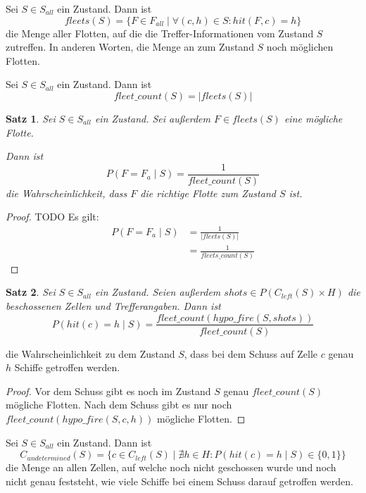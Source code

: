 \documentclass[a4paper,12pt]{llncs}
\numberwithin{equation}{section}
\newtheorem{satz}{Satz}
\begin{document}
\begin{definition}
Sei $S\in S_{all}$ ein Zustand.
Dann ist
\[
fleets(S)=\{F\in F_{all} \mid \forall (c,h) \in S \colon hit(F, c)=h\}
\]
die Menge aller Flotten, auf die die Treffer-Informationen vom Zustand $S$ zutreffen.
In anderen Worten, die Menge an zum Zustand $S$ noch möglichen Flotten.
\end{definition}

\begin{definition}
Sei $S\in S_{all}$ ein Zustand.
Dann ist
\[
fleet\_count(S)=|fleets(S)|
\]
\end{definition}


\begin{satz}
Sei $S\in S_{all}$ ein Zustand.
Sei außerdem $F \in fleets(S)$ eine mögliche Flotte.

Dann ist
\[
P(F = F_a \mid S)=\frac{1}{fleet\_count(S)}
\]
die Wahrscheinlichkeit, dass $F$ die richtige Flotte zum Zustand $S$ ist.
\end{satz}

\begin{proof}
TODO
Es gilt:
\begin{align}
P(F=F_a\mid S)&= \frac{1}{\left|fleets(S)\right|} \nonumber\\
 &= \frac{1}{fleets\_count(S)}\nonumber
\end{align}
\end{proof}


\begin{satz}
Sei $S\in S_{all}$ ein Zustand.
Seien außerdem $shots \in P(C_{left}(S) \times H)$ die beschossenen Zellen und Trefferangaben.
Dann ist
\[
P(hit(c)=h \mid S)=\frac{fleet\_count(hypo\_fire(S, shots))}{fleet\_count(S)}
\]
\end{satz}
die Wahrscheinlichkeit zu dem Zustand $S$, dass bei dem Schuss auf Zelle $c$ genau $h$ Schiffe getroffen werden.

\begin{proof}
Vor dem Schuss gibt es noch im Zustand $S$ genau $fleet\_count(S)$ mögliche Flotten.
Nach dem Schuss gibt es nur noch \\$fleet\_count(hypo\_fire(S,c, h))$ mögliche Flotten.
\end{proof}


\begin{definition}
Sei $S\in S_{all}$ ein Zustand.
Dann ist
\[
C_{undetermined}(S)=\{ c \in C_{left}(S) \mid \nexists h \in H \colon P(hit(c)=h \mid S) \in \{0, 1\}\}
\]
die Menge an allen Zellen, auf welche noch nicht geschossen wurde und noch nicht genau feststeht, wie viele Schiffe bei einem Schuss darauf getroffen werden.
\end{definition}
\end{document}
